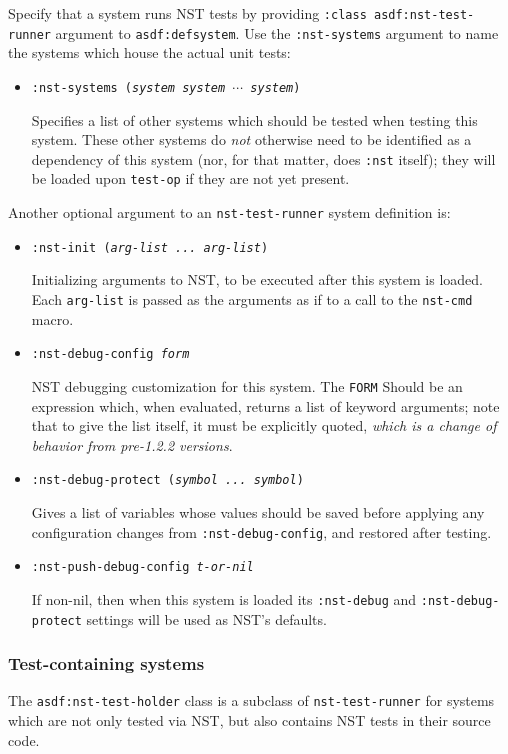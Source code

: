 Specify that a system runs NST tests by providing \texttt{:class
  asdf:nst-test-runner} argument to \texttt{asdf:defsystem}.  Use the
\texttt{:nst-systems} argument to name the systems which house the
actual unit tests:
\begin{itemize}
\item\texttt{:nst-systems ({\slshape system} {\slshape system}
    $\cdots$ {\slshape system})}\par Specifies a list of other systems
  which should be tested when testing this system.  These other
  systems do \emph{not} otherwise need to be identified as a
  dependency of this system (nor, for that matter, does \texttt{:nst}
  itself); they will be loaded upon \texttt{test-op} if they are not
  yet present.
\end{itemize}
Another optional argument to an \texttt{nst-test-runner} system
definition is:
\begin{itemize}
\item\texttt{:nst-init ({\slshape arg-list ...\ arg-list})}\par
  Initializing arguments to NST, to be executed after this system is
  loaded.  Each \texttt{arg-list} is passed as the arguments as if to
  a call to the \texttt{nst-cmd} macro.
\item\texttt{:nst-debug-config {\slshape form}}\par NST debugging
  customization for this system.  The \texttt{FORM} Should be an
  expression which, when evaluated, returns a list of keyword
  arguments; note that to give the list itself, it must be explicitly
  quoted, \emph{which is a change of behavior from pre-1.2.2
    versions}.
\item\texttt{:nst-debug-protect ({\slshape symbol ...\ symbol})} \par
  Gives a list of variables whose values should be saved before
  applying any configuration changes from \texttt{:nst-debug-config},
  and restored after testing.
\item\texttt{:nst-push-debug-config {\slshape t-or-nil}}\par If
  non-nil, then when this system is loaded its \texttt{:nst-debug} and
  \texttt{:nst-debug-protect} settings will be used as NST's defaults.
\end{itemize}

\subsubsection{Test-containing systems}
The \texttt{asdf:nst-test-holder} class is a subclass of
\texttt{nst-test-runner} for systems which are not only tested via
NST, but also contains NST tests in their source code.

